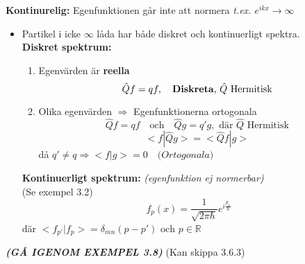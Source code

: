 \documentclass{article}
\begin{document}
    \textbf{Kontinurelig:} Egenfunktionen går inte att normera \textit{t.ex. $e^{ikx}\rightarrow\infty$}
    \begin{itemize}
      \item Partikel i icke $\infty$ låda har både diskret och kontinuerligt spektra.\\

      \textbf{Diskret spektrum:}
      \begin{enumerate}
        \item Egenvärden är \textbf{reella}
        \[
          \hat{Q}f=qf,\quad\text{\textbf{Diskreta}, $\hat{Q}$ Hermitisk}
        \]
        \item Olika egenvärden $\Rightarrow$ Egenfunktionerna ortogonala
        \[
          \hat{Q}f=qf\quad\text{och}\quad\hat{Q}g=q'g,\text{ där $\hat{Q}$ Hermitisk}
        \]
        \[
          <f|\hat{Q}g>=<\hat{Q}f|g>
        \]
        då $q'\neq q\Rightarrow<f|g>=0\quad\textit{(Ortogonala)}$
      \end{enumerate}
      \textbf{Kontinuerligt spektrum:} \textit{(egenfunktion ej normerbar)}\\
      (Se exempel 3.2)
      \[
        f_p(x)=\frac{1}{\sqrt{2\pi\hbar}}e^{i\frac{p_x}{\hbar}}
      \]
      där $<f_{p'}|f_p>=\delta_{mn}(p-p')\text{ och }p\in\mathbb{R}$

    \end{itemize}

    \textbf{\textit{(GÅ IGENOM EXEMPEL 3.8)}} (Kan skippa 3.6.3)
\end{document}
